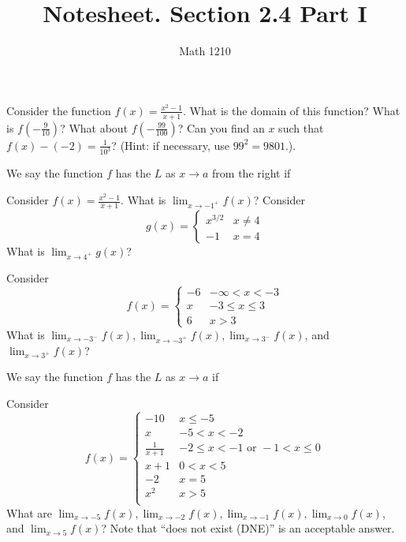 \documentclass[12pt, a4paper]{article}
\author{Math 1210}
\title{Notesheet. Section 2.4 Part I}
\date{}
\begin{document}
\maketitle
\nameline
\begin{ex}
  Consider the function \(f(x) = \frac{x^2-1}{x+1}\). What is the domain
  of this function? What is \(f\left(-\frac{9}{10}\right)\)? What about
  \(f\left(-\frac{99}{100}\right)\)? Can you find an \(x\) such that \(f(x) - (-2)
  = \frac{1}{10^3}\)? (Hint: if necessary, use \(99^2 = 9801\).).
\end{ex}
\begin{defi}
  We say the function \(f\) has the  \(L\) as
  \(x \to a\) from
  the right if
\end{defi}
\begin{ex}
  Consider \(f(x) = \frac{x^2-1}{x+1}\). What is \(\lim_{x \to -1^+}
  f(x)\)? Consider \[
    g(x) =
    \begin{cases}
      x^{3/2} & x \neq 4 \\
      -1 & x = 4
    \end{cases}
  \]
  What is \(\lim_{x \to 4^+} g(x)\)?
\end{ex}
\begin{ex}
  Consider \[
    f(x) =
    \begin{cases}
      -6 & -\infty < x < -3 \\
      x & -3 \leq x \leq 3 \\
      6 & x > 3
    \end{cases}
  \]
  What is \(\lim_{x \to -3^-} f(x), \lim_{x \to -3^+} f(x), \lim_{x
    \to 3^-}f(x)\), and \(\lim_{x \to 3^+} f(x)\)?
\end{ex}
\begin{defi}
  We say the function \(f\) has the  \(L\) as \(x \to
  a\) if
\end{defi}
\begin{ex}
  Consider \[
    f(x) =
    \begin{cases}
      -10 & x \leq -5 \\
      x & -5 < x < -2 \\
      \frac{1}{x+1} & -2 \leq x < -1 \text{ or } -1 < x \leq 0\\
      x+1 & 0 < x < 5 \\
      -2 & x = 5 \\
      x^2 & x > 5 \\
    \end{cases}
  \]
  What are \(\lim_{x \to -5} f(x), \lim_{x \to -2} f(x), \lim_{x \to
    -1} f(x), \lim_{x \to 0} f(x)\), and \(\lim_{x \to 5} f(x)\)? Note
  that ``does not exist (DNE)'' is an acceptable answer.
\end{ex}
\end{document}
